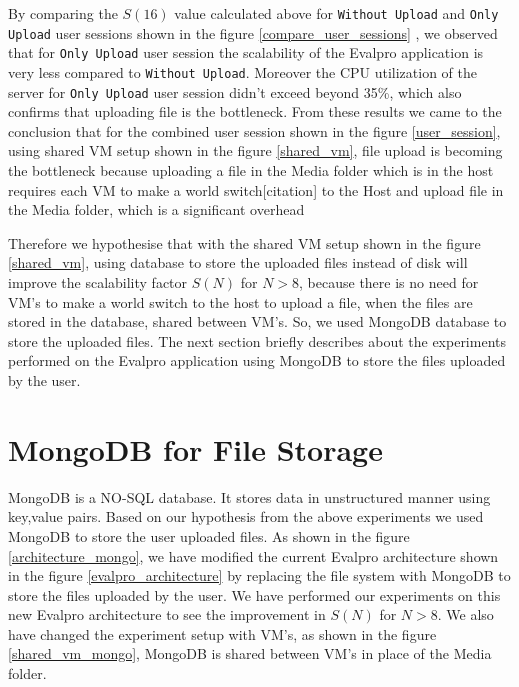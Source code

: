 \documentclass[sigconf]{acmart}
\begin{document}
By comparing the $S(16)$  value calculated above for \texttt{Without Upload} and  \texttt{Only Upload} user sessions shown in the figure  \ref{compare_user_sessions} , we observed that for \texttt{Only Upload} user session the scalability  of the Evalpro application is very less compared to \texttt{Without Upload}. Moreover the CPU utilization of the server for  \texttt{Only Upload} user session  didn't exceed beyond 35\%, which also confirms that uploading file is the bottleneck. From these results we came to the conclusion that for the combined user session shown in the figure \ref{user_session}, using shared VM setup shown in the figure \ref{shared_vm}, file upload is becoming the bottleneck because uploading a file in the Media folder which is in the host requires each VM to make a world switch[citation] to the Host and upload file in the Media folder, which is a significant overhead

Therefore we hypothesise that with the shared VM setup shown in the figure \ref{shared_vm},  using database to store the uploaded files instead of disk will improve the scalability factor $S(N)$ for $N>8$, because there is no need for VM's to make a world switch to the host to upload a file,  when the files are stored in the  database, shared between VM's. So, we used MongoDB database to store the uploaded files. The next section briefly describes about the experiments performed on the Evalpro application using MongoDB to store the files uploaded by the user.

\section{MongoDB for File Storage}\label{mongodb_filestorage}
MongoDB is a NO-SQL database. It stores data in unstructured manner using key,value pairs. Based on our hypothesis from the above experiments we used MongoDB to store the user uploaded files. As shown in the figure \ref{architecture_mongo}, we have modified the current Evalpro architecture shown in the figure \ref{evalpro_architecture} by replacing the file system with MongoDB to store the files uploaded by the user. We have performed our experiments on this new Evalpro architecture to see the improvement in $S(N)$ for $N>8$. We also have changed the experiment setup with VM's, as shown in the figure \ref{shared_vm_mongo}, MongoDB is shared between VM's in place of the Media folder. 
\end{document}
